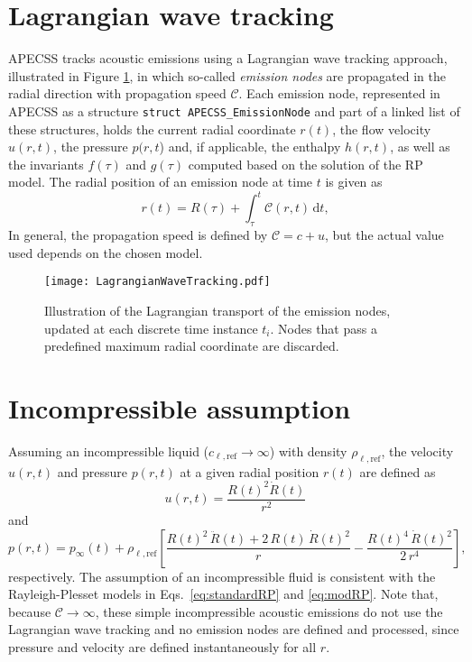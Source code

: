 \section{Lagrangian wave tracking}

APECSS tracks acoustic emissions using a Lagrangian wave tracking approach, illustrated in Figure \ref{fig:lagrangiantracking}, in which so-called \textit{emission nodes} are propagated in the radial direction with propagation speed $\mathcal{C}$. Each emission node, represented in APECSS as a structure {\tt struct APECSS\_EmissionNode} and part of a linked list of these structures, holds the current radial coordinate $r(t)$, the flow velocity $u(r,t)$, the pressure $p(r,t$) and, if applicable, the enthalpy $h(r,t)$, as well as the invariants $f(\tau)$ and $g(\tau)$ computed based on the solution of the RP model. The radial position of an emission node at time $t$ is given as
\begin{equation}
    r(t) = R(\tau) + \int_\tau^t \mathcal{C}(r,t) \, \mathrm{d}t, 
    \label{eq:r_t}
\end{equation}
In general, the propagation speed is defined by $\mathcal{C}=c+u$, but the actual value used depends on the chosen model.

\begin{figure}
    \begin{center}
    \texttt{[image: LagrangianWaveTracking.pdf]}
    \caption{Illustration of the Lagrangian transport of the emission nodes, updated at each discrete time instance $t_i$. Nodes that pass a predefined maximum radial coordinate are discarded.}
    \label{fig:lagrangiantracking}
    \end{center}
\end{figure}

\section{Incompressible assumption}

Assuming an incompressible liquid ($c_{\ell,\mathrm{ref}} \rightarrow  \infty$) with density $\rho_{\ell,\mathrm{ref}}$, the velocity $u(r,t)$ and pressure $p(r,t)$ at a given radial position $r(t)$ are defined as \citep{Neppiras1980}
\begin{equation}
    u(r,t) = \frac{R(t)^2 \dot{R}(t)}{r^2}  \label{eq:u_rt_incomp} 
\end{equation}
and 
\begin{equation}
    p(r,t) = p_\infty(t) + \rho_{\ell,\mathrm{ref}} \left[\frac{R(t)^2 \, \ddot{R}(t) + 2 \, R(t) \, \dot{R}(t)^2}{r} - \frac{R(t)^4 \, \dot{R}(t)^2}{2 \, r^4} \right], \label{eq:p_rt_incomp}
\end{equation}
respectively. The assumption of an incompressible fluid is consistent with the Rayleigh-Plesset models in Eqs.~\eqref{eq:standardRP} and \eqref{eq:modRP}. Note that, because $\mathcal{C} \rightarrow \infty$, these simple incompressible acoustic emissions do not use the Lagrangian wave tracking and no emission nodes are defined and processed, since pressure and velocity are defined instantaneously for all $r$.

